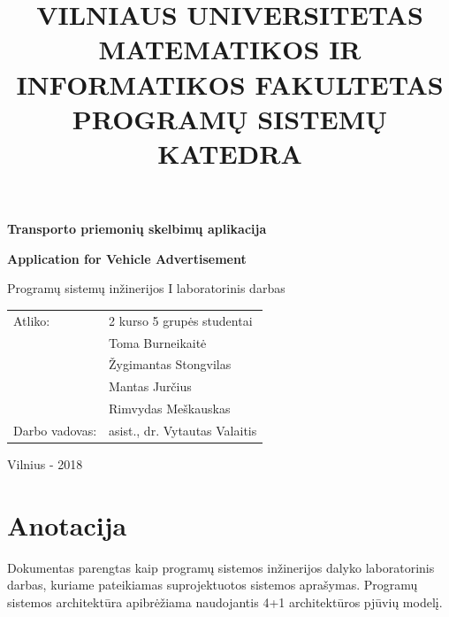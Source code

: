 \documentclass[12pt]{article}
\title{VILNIAUS UNIVERSITETAS \\
MATEMATIKOS IR INFORMATIKOS FAKULTETAS \\
PROGRAMŲ SISTEMŲ KATEDRA}
\author{}
\date{}
\renewcommand{\baselinestretch}{1.5}
\begin{document}
	\clearpage
	\maketitle
	\thispagestyle{empty}

	\bigbreak
	\bigbreak
	\bigbreak
	\bigbreak

	\begin{center}
		\begin{Large}
			\textbf{Transporto priemonių skelbimų aplikacija} \\
		\end{Large}
		\begin{large}
			\textbf{Application for Vehicle Advertisement} \\
		\end{large}
		Programų sistemų inžinerijos I laboratorinis darbas \\

		\bigbreak
		\bigbreak
		\bigbreak
		\bigbreak
		\bigbreak
		\bigbreak
		\bigbreak
		\bigbreak
		\bigbreak

		\begin{tabular}{ll}
			Atliko:        & 2 kurso 5 grupės studentai \\
		               	   & Toma Burneikaitė \\
		               	   & Žygimantas Stongvilas \\
		                   & Mantas Jurčius \\
		                   & Rimvydas Meškauskas \\
			Darbo vadovas: & asist., dr. Vytautas Valaitis
		\end{tabular}

		\bigbreak
		\bigbreak
		\bigbreak
		\bigbreak
		\bigbreak
		\bigbreak
		\bigbreak
		\bigbreak
		\bigbreak

		Vilnius - 2018
	\end{center}
	\pagebreak
	
	\renewcommand{\baselinestretch}{0.5}
	\tableofcontents
	\renewcommand{\baselinestretch}{1.5}
	\pagebreak	
	
	\part*{Anotacija}
	\begin{indent}
	Dokumentas parengtas kaip programų sistemos inžinerijos dalyko laboratorinis darbas, kuriame pateikiamas suprojektuotos sistemos aprašymas. Programų sistemos architektūra apibrėžiama naudojantis 4+1 architektūros pjūvių modelį.
	\end{indent}
	\pagebreak
	
\end{document}
